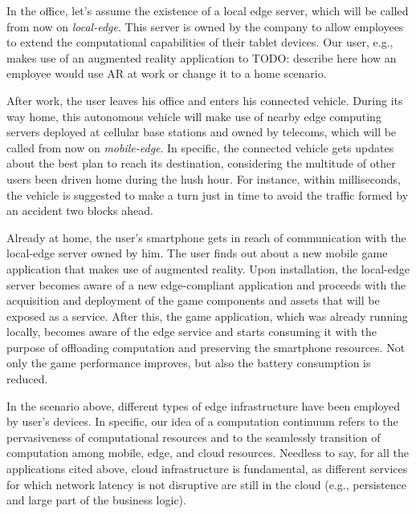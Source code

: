 In the office, let's assume the existence of a local edge server, which will be called from now on \textit{local-edge}. This server is owned by the company to allow employees to extend the computational capabilities of their tablet devices. Our user, e.g., makes use of an augmented reality application to TODO: describe here how an employee would use AR at work or change it to a home scenario.

After work, the user leaves his office and enters his connected vehicle. During its way home, this autonomous vehicle will make use of nearby edge computing servers deployed at cellular base stations and owned by telecoms, which will be called from now on \textit{mobile-edge}. In specific, the connected vehicle gets updates about the best plan to reach its destination, considering the multitude of other users been driven home during the hush hour. For instance, within milliseconds, the vehicle is suggested to make a turn just in time to avoid the traffic formed by an accident two blocks ahead. 

Already at home, the user's smartphone gets in reach of communication with the local-edge server owned by him. The user finds out about a new mobile game application that makes use of augmented reality. Upon installation, the local-edge server becomes aware of a new edge-compliant application and proceeds with the acquisition and deployment of the game components and assets that will be exposed as a service. After this, the game application, which was already running locally, becomes aware of the edge service and starts consuming it with the purpose of offloading computation and preserving the smartphone resources. Not only the game performance improves, but also the battery consumption is reduced.  

In the scenario above, different types of edge infrastructure have been employed by user's devices. In specific, our idea of a computation continuum refers to the pervasiveness of computational resources and to the seamlessly transition of computation among mobile, edge, and cloud resources. Needless to say, for all the applications cited above, cloud infrastructure is  fundamental, as different services for which network latency is not disruptive are still in the cloud (e.g., persistence and large part of the business logic).